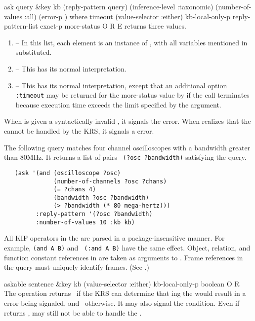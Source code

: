 \begin{okbcop}{ask}{ query \&key kb (reply-pattern query) (inference-level :taxonomic) (number-of-values :all) (error-p \true) where timeout (value-selector :either) kb-local-only-p} { reply-pattern-list exact-p more-status } { O } { R } { E }
    returns three values.
   \begin{enumerate}
   \item {} -- In this list, each element is an
          instance of , with all variables mentioned in
           substituted.
   \item {} -- This has its normal interpretation.
   \item {} -- This has its normal interpretation, except
          that an additional option {\tt :timeout} may be returned for the
          more-status value by  if the call terminates because
          execution time exceeds the limit specified by the 
          argument.
   \end{enumerate}
   When  is given a syntactically invalid , it
   signals the  error.  When  realizes that
   the  cannot be handled by the KRS, it signals a
    error.

   The following query matches four channel oscilloscopes with a
   bandwidth greater than 80MHz.  It returns a list of pairs {\tt
   (?osc ?bandwidth)} satisfying the query.
   \begin{verbatim}
   (ask '(and (oscilloscope ?osc)
              (number-of-channels ?osc ?chans)
              (= ?chans 4)
              (bandwidth ?osc ?bandwidth)
              (> ?bandwidth (* 80 mega-hertz)))
         :reply-pattern '(?osc ?bandwidth)
         :number-of-values 10 :kb kb)
   \end{verbatim}
   All KIF operators in the  are parsed in a
   package-insensitive manner.  For example, {\tt (and A B)} and {\tt
   (:and A B)} have the same effect.  Object, relation, and function constant
   references in  are taken as arguments to 
   .  Frame references in the query must uniquely 
   identify frames.  (See .)
\end{okbcop}

\begin{okbcop}{askable}{ sentence \&key kb (value-selector :either) kb-local-only-p} { boolean } { O } { R } {  }
The  operation returns \false\ if the KRS can
   determine that ing the  would result in a
    error being signaled, and \true\ otherwise.
   It may also signal the  condition.  Even if
    returns \true,
    may still not be able to handle the .
\end{okbcop}

